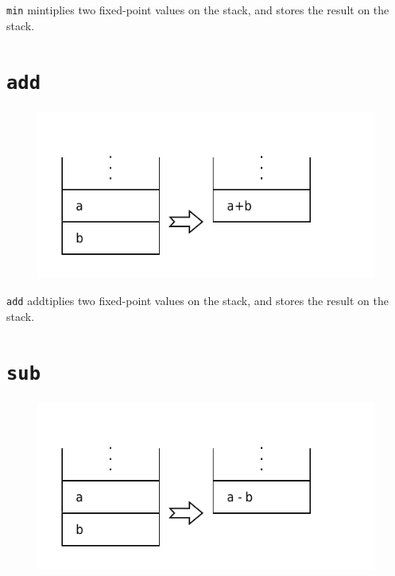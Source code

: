 		\texttt{min} mintiplies two fixed-point values on the stack, and stores
		the result on the stack.

\section*{\texttt{add}}

	\begin{figure}
		\begin{flushright}
			\includegraphics[width=0.9\linewidth]{figure/pdf/i_add} 
		\end{flushright}
	\end{figure}

		\texttt{add} addtiplies two fixed-point values on the stack, and stores
		the result on the stack.

\section*{\texttt{sub}}

	\begin{figure}
		\begin{flushright}
			\includegraphics[width=0.9\linewidth]{figure/pdf/i_sub} 
		\end{flushright}
	\end{figure}

